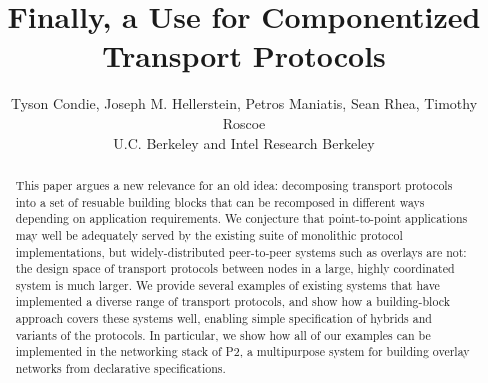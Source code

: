 \documentclass[10pt,twocolumn]{article}
\begin{document}
\title{Finally, a Use for Componentized Transport Protocols}
\author{Tyson Condie, Joseph M. Hellerstein, Petros Maniatis, Sean
  Rhea, Timothy Roscoe \\
U.C. Berkeley and Intel Research Berkeley}
\date{}
\maketitle
\thispagestyle{plain}

\begin{abstract}
This paper argues a new relevance for an old idea: decomposing
transport protocols into a set of resuable building blocks that can be
recomposed in different ways depending on application requirements.
We conjecture that point-to-point applications may well be adequately
served by the existing suite of monolithic protocol implementations,
but widely-distributed peer-to-peer systems such as overlays are not:
the design space of transport protocols between nodes in a
large, highly coordinated system is much larger.  We provide several
examples of existing systems that have implemented a diverse range of
transport protocols, and show how a building-block approach covers
these systems well, enabling simple specification of hybrids and
variants of the protocols.  In particular, we show how all of our examples 
can be implemented in the networking stack of P2, a multipurpose system for
building overlay networks from declarative specifications. 



\end{abstract}
\end{document}
